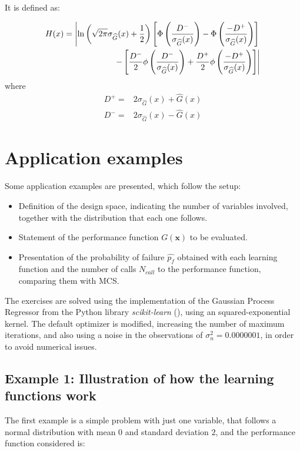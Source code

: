 It is defined as:

\begin{equation}
\begin{split}  
    H(x) =  \left\lvert \ln{\left( \sqrt{2\pi}\sigma_{\widehat{G}}(x) + \frac{1}
    {2} \right)} \left[ \Phi \left( \frac{D^-}{\sigma_{\widehat{G}}(x)} \right) -
    \Phi \left( \frac{-D^+}{\sigma_{\widehat{G}}(x)} \right) \right]\right. \\ 
    \left. - \left[ \frac{D^-}{2}\phi \left( \frac{D^-}{\sigma_{\widehat{G}}(x)} \right)
    + \frac{D^+}{2} \phi \left( \frac{-D^+}{\sigma_{\widehat{G}}(x)} \right) \right] \right\rvert
\end{split}
\end{equation}
where 
\begin{align*}
    D^+ =& 2\sigma_{\widehat{G}}(x) + \widehat{G}(x) \\
    D^- =& 2\sigma_{\widehat{G}}(x) - \widehat{G}(x)
\end{align*}


\section{Application examples}
Some application examples are presented, which follow the setup:
\begin{itemize}
  \item Definition of the design space, indicating the number of variables involved, together with the distribution that each one follows.
  \item Statement of the performance function $G(\bm{x})$ to be evaluated.
  \item Presentation of the probability of failure $\widehat{p_f}$ obtained with each learning function and the number of calls $N_{call}$ to the performance function, comparing them with MCS. 
\end{itemize}

The exercises are solved using the implementation of the Gaussian Process Regressor from the Python library \textit{scikit-learn} (\citep{scikit-learn}), using an squared-exponential kernel. The default optimizer is modified, increasing the number of maximum iterations, and also using a noise in the observations of $\sigma_n^2 = \num[round-precision=1,round-mode=figures]{0.0000001}$, in order to avoid numerical issues. 
 
\subsection{Example 1: Illustration of how the learning functions work}
The first example is a simple problem with just one variable, that follows a normal distribution
with mean $0$ and standard deviation $2$, and the performance function considered is: 


